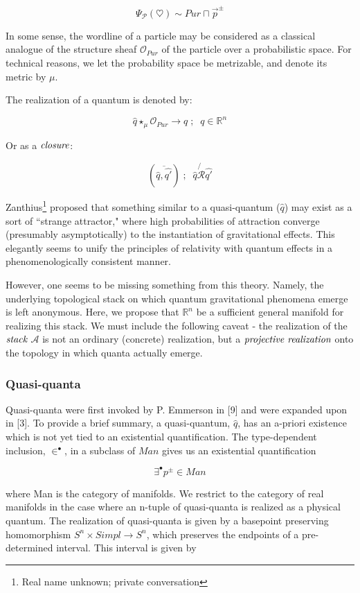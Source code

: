 \documentclass{article}
\begin{document}
$$\Psi_\mathcal{P}(\heartsuit) \sim Pur \sqcap \vec{p}^\pm$$

In some sense, the wordline of a particle may be considered as a classical analogue of the structure sheaf $\mathcal{O}_{Pur}$ of the particle over a probabilistic space. For technical reasons, we let the probability space be metrizable, and denote its metric by $\mu$.

The realization of a quantum is denoted by:

$$\hat{q} \star_\mu \mathcal{O}_{Pur} \longrightarrow q \; ; \;\; q \in \mathbb{R}^n$$

Or as a $\emph{closure}$:

$$(\overline{\hat{q},\hat{q'}}) \; ; \; \; \hat{q}\not{\mathcal{R}}\hat{q'}$$

Zanthius\footnote{Real name unknown; private conversation} proposed that something similar to a quasi-quantum ($\hat{q}$) may exist as a sort of ``strange attractor," where high probabilities of attraction converge (presumably asymptotically) to the instantiation of gravitational effects. This elegantly seems to unify the principles of relativity with quantum effects in a phenomenologically consistent manner.

	However, one seems to be missing something from this theory. Namely, the underlying topological stack on which quantum gravitational phenomena emerge is left anonymous. Here, we propose that $\mathbb{R}^n$ be a sufficient general manifold for realizing this stack. We must include the following caveat - the realization of the $\emph{stack}$ $\mathscr{A}$ is not an ordinary (concrete) realization, but a $\emph{projective realization}$ onto the topology in which quanta actually emerge.
	
	\subsubsection{Quasi-quanta}
	Quasi-quanta were first invoked by P. Emmerson in [9] and were expanded upon in [3]. To provide a brief summary, a quasi-quantum, $\hat{q}$, has an a-priori existence which is not yet tied to an existential quantification. The type-dependent inclusion, $\in^\bullet$, in a subclass of $Man$ gives us an existential quantification
	
	$${\exists^\bullet} p^\pm \in Man$$
	
	where Man is the category of manifolds. We restrict to the category of real manifolds in the case where an n-tuple of quasi-quanta is realized as a physical quantum. The realization of quasi-quanta is given by a basepoint preserving homomorphism $S^n \times Simpl \longrightarrow S^n$, which preserves the endpoints of a pre-determined interval. This interval is given by
	
\end{document}
